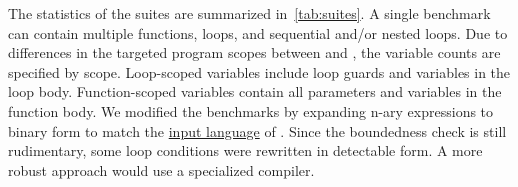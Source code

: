 The statistics of the suites are summarized in~\autoref{tab:suites}.
A single benchmark can contain multiple functions, loops, and sequential and/or nested loops.
Due to differences in the targeted program scopes between \ndx{\impl} and \ndx{\impf}, the variable counts are specified by scope.
Loop-scoped variables include loop guards and variables in the loop body.
Function-scoped variables contain all parameters and variables in the function body.
We modified the benchmarks by expanding n-ary expressions to binary form to match the \href{https://statycc.github.io/pymwp/features/}{input language} of .
Since the boundedness check is still rudimentary, some loop conditions were rewritten in detectable form.
A more robust approach would use a specialized compiler.
